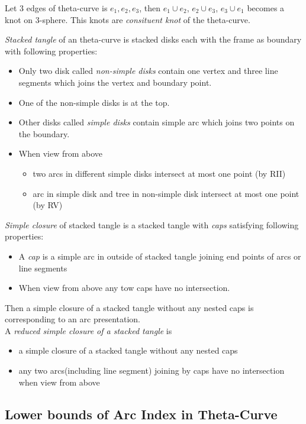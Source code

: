\documentclass{article}
\theoremstyle{definition}
\theoremstyle{theorem}
\theoremstyle{proposition}
\theoremstyle{corollary}
\begin{document}
Let 3 edges of theta-curve is $e_1, e_2, e_3$, then $e_1 \cup e_2$, $e_2 \cup e_3$, $e_3 \cup e_1$ becomes a knot on 3-sphere. This knots are \textit{consituent knot} of the theta-curve.

\textit{Stacked tangle} of an theta-curve is stacked disks each with the frame as boundary with following properties:
\begin{itemize}
\item Only two disk called \textit{non-simple disks} contain one vertex and three line
segments which joins the vertex and boundary point.
\item One of the non-simple disks is at the top.
\item Other disks called \textit{simple disks} contain simple arc which joins two
points on the boundary.
\item When view from above
\begin{itemize}
    \item two arcs in different simple disks intersect at most one point (by RII)
    \item arc in simple disk and tree in non-simple disk intersect at most one
point (by RV)
\end{itemize}
\end{itemize}

\textit{Simple closure} of stacked tangle is a stacked tangle with \textit{caps} satisfying following properties:
\begin{itemize}
    \item A \textit{cap} is a simple arc in outside of stacked tangle joining end points of arcs or line segments
    \item When view from above any tow caps have no intersection.
\end{itemize}
Then a simple closure of a stacked tangle without any nested caps is
corresponding to an arc presentation.\\

A \textit{reduced simple closure of a stacked tangle} is
\begin{itemize}
    \item a simple closure of a stacked tangle without any nested caps
    \item any two arcs(including line segment) joining by caps have no intersection when view from above
\end{itemize}

\subsection{Lower bounds of Arc Index in Theta-Curve}
\end{document}

